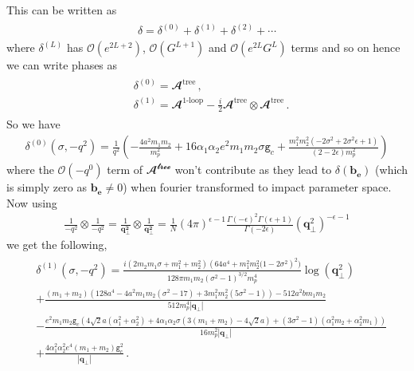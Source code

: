 This can be written as 
\begin{align}
    \begin{split}
        \delta= \delta^{(0)}+\delta^{(1)}+\delta^{(2)}+\cdots
    \end{split}
\end{align}
where $ \delta^{(L)}$ has $\mathcal{O}(e^{2L+2})$,  $\mathcal{O}(G^{L+1})$ and $\mathcal{O}(e^{2L} G^{L})$ terms and so on hence we can write phases as
\begin{align}
    \begin{split}
    &\delta^{(0)}=\mathbfcal{A}^{\textrm{tree}}\,, \\
    & \delta^{(1)}=\mathbfcal{A}^{\textrm{1-loop}} -\frac{i}{2} \mathbfcal{A}^{\textrm{tree}} \otimes \mathbfcal{A}^{\textrm{tree}}\,.
    \end{split}
\end{align}
So we have
\begin{align}
    \delta^{(0)}(\sigma, -q^2)= \frac{1}{q^2} \left( -\frac{4 a^2 m_1 m_2}{m_p^2} + 16 \alpha _1 \alpha _2 e^2   m_1 m_2 \sigma   \texttt{g}_c+\frac{m_1^2 m_2^2 \left(-2 \sigma ^2+2 \sigma ^2 \epsilon +1\right)}{(2-2 \epsilon ) m_p^2} \right) \label{del0p}
\end{align}
where the $\mathcal{O}(-q^0)$ term of $\mathbfcal{A^{\textrm{tree}}}$ won't contribute as they lead to $\delta(\boldsymbol{b_e})$ (which is simply zero as $\boldsymbol{b_e} \neq 0$) when fourier transformed to impact parameter space.
Now using 
\begin{align}
    \frac{1}{-q^2}\otimes\frac{1}{-q^2}=\frac{1}{\boldsymbol{q^2_\perp}}\otimes\frac{1}{\boldsymbol{q^2_\perp}}=\frac{1}{N} (4 \pi )^{\epsilon -1}  \frac{  \Gamma (-\epsilon )^2 \Gamma (\epsilon +1)}{\Gamma (-2 \epsilon )} (\boldsymbol{q}^2_\perp)^{-\epsilon -1}
\end{align}
we get the following, 
\begin{align}
    \begin{split}
        &\delta^{(1)}(\sigma, -q^2) = \frac{i \left(2 m_2 m_1 \sigma +m_1^2+m_2^2\right) \left(64 a^4+m_1^2 m_2^2 (1-2 \sigma ^2\right)^2)}{128 \pi  m_1 m_2 \left(\sigma ^2-1\right)^{3/2} m_p^4} \log{(\boldsymbol{q}^2_\perp )}  \\
        & + \frac{\left(m_1+m_2\right) \left(128 a^4-4 a^2 m_1 m_2 \left(\sigma ^2-17\right)+3 m_1^2 m_2^2 \left(5 \sigma ^2-1\right)\right)-512 a^2 b m_1 m_2}{512 m_p^4 |\boldsymbol{q}_\perp|} \\
        & -\frac{e^2 m_1 m_2 \texttt{g}_c \left(4 \sqrt{2} a \left(\alpha _1^2+\alpha _2^2\right)+4 \alpha _1 \alpha _2 \sigma  \left(3 \left(m_1+m_2\right)-4 \sqrt{2} a\right)+\left(3 \sigma ^2-1\right) \left(\alpha _1^2 m_2+\alpha _2^2 m_1\right)\right)}{16 m_p^2 |\boldsymbol{q}_\perp|} \\
        &  +\frac{4 \alpha _1^2 \alpha _2^2 e^4 \left(m_1+m_2\right) \texttt{g}_c^2}{|\boldsymbol{q_\perp}|}\,.
        \label{del1p}
    \end{split}
\end{align}
